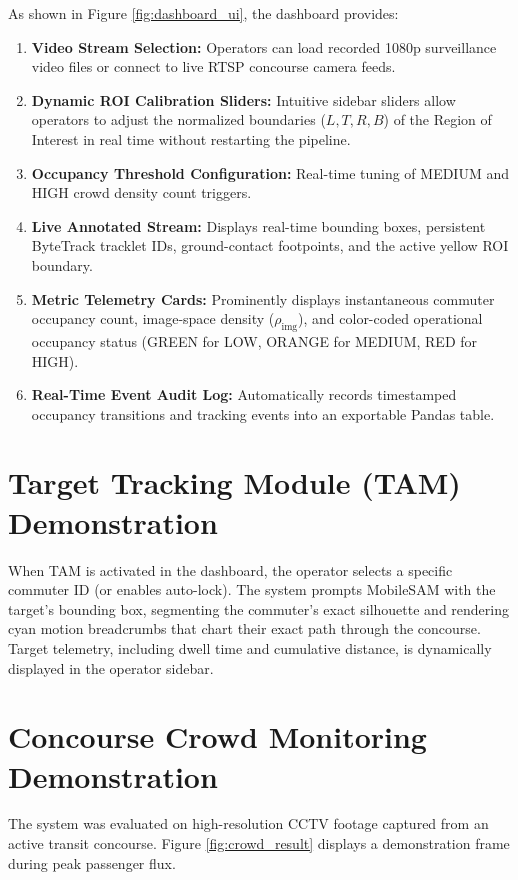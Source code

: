 \documentclass[12pt,a4paper]{report}
\begin{document}
\noindent As shown in Figure \ref{fig:dashboard_ui}, the dashboard provides:
\begin{enumerate}
    \item \textbf{Video Stream Selection:} Operators can load recorded 1080p surveillance video files or connect to live RTSP concourse camera feeds.
    \item \textbf{Dynamic ROI Calibration Sliders:} Intuitive sidebar sliders allow operators to adjust the normalized boundaries ($L, T, R, B$) of the Region of Interest in real time without restarting the pipeline.
    \item \textbf{Occupancy Threshold Configuration:} Real-time tuning of MEDIUM and HIGH crowd density count triggers.
    \item \textbf{Live Annotated Stream:} Displays real-time bounding boxes, persistent ByteTrack tracklet IDs, ground-contact footpoints, and the active yellow ROI boundary.
    \item \textbf{Metric Telemetry Cards:} Prominently displays instantaneous commuter occupancy count, image-space density ($\rho_{\text{img}}$), and color-coded operational occupancy status (GREEN for LOW, ORANGE for MEDIUM, RED for HIGH).
    \item \textbf{Real-Time Event Audit Log:} Automatically records timestamped occupancy transitions and tracking events into an exportable Pandas table.
\end{enumerate}

\section{Target Tracking Module (TAM) Demonstration}
When TAM is activated in the dashboard, the operator selects a specific commuter ID (or enables auto-lock). The system prompts MobileSAM with the target's bounding box, segmenting the commuter's exact silhouette and rendering cyan motion breadcrumbs that chart their exact path through the concourse. Target telemetry, including dwell time and cumulative distance, is dynamically displayed in the operator sidebar.

\section{Concourse Crowd Monitoring Demonstration}
The system was evaluated on high-resolution CCTV footage captured from an active transit concourse. Figure \ref{fig:crowd_result} displays a demonstration frame during peak passenger flux.
\end{document}
